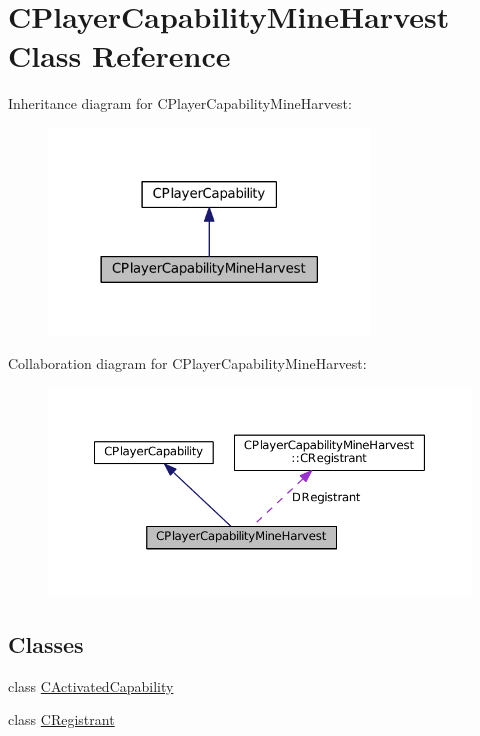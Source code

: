 \hypertarget{classCPlayerCapabilityMineHarvest}{}\section{C\+Player\+Capability\+Mine\+Harvest Class Reference}
\label{classCPlayerCapabilityMineHarvest}


Inheritance diagram for C\+Player\+Capability\+Mine\+Harvest\+:\nopagebreak
\begin{figure}[H]
\begin{center}
\leavevmode
\includegraphics[width=242pt]{classCPlayerCapabilityMineHarvest__inherit__graph}
\end{center}
\end{figure}


Collaboration diagram for C\+Player\+Capability\+Mine\+Harvest\+:\nopagebreak
\begin{figure}[H]
\begin{center}
\leavevmode
\includegraphics[width=350pt]{classCPlayerCapabilityMineHarvest__coll__graph}
\end{center}
\end{figure}
\subsection*{Classes}
\begin{DoxyCompactItemize}
\item 
class \hyperlink{classCPlayerCapabilityMineHarvest_1_1CActivatedCapability}{C\+Activated\+Capability}
\item 
class \hyperlink{classCPlayerCapabilityMineHarvest_1_1CRegistrant}{C\+Registrant}
\end{DoxyCompactItemize}
